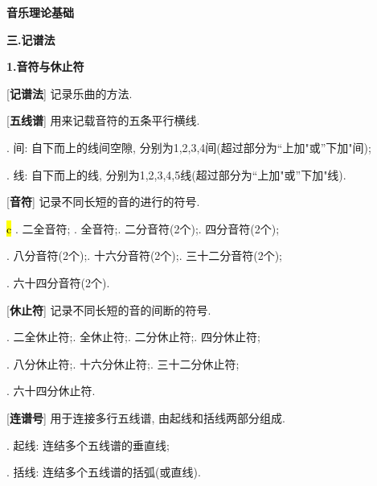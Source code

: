 

\begin{center} 
 \Large \textbf{音乐理论基础}\par
 \textbf{三.记谱法}
\end{center}

\large 
\begin{center}
 \textbf{1.音符与休止符}\\
\end{center}

[\textbf{记谱法}] 记录乐曲的方法.\par

[\textbf{五线谱}] 用来记载音符的五条平行横线.\par
\startextract \zendextract
{}. 间: 自下而上的线间空隙, 分别为1,2,3,4间(超过部分为``上加"或''下加"间);\par
{}. 线: 自下而上的线, 分别为1,2,3,4,5线(超过部分为``上加"或''下加"线).\par

[\textbf{音符}] 记录不同长短的音的进行的符号.\par
\startextract \Notes {}   \hl{c}           \en\zendextract
{}. 二全音符; . 全音符;. 二分音符(2个);. 四分音符(2个);\par
{}. 八分音符(2个);. 十六分音符(2个);. 三十二分音符(2个);\par
{}. 六十四分音符(2个).\par

[\textbf{休止符}] 记录不同长短的音的间断的符号.\par
\startextract \Notes \PAuse \pause \hp \qp \ds \qs \hs \qqs \en\zendextract
{}. 二全休止符;. 全休止符;. 二分休止符;. 四分休止符;\par
{}. 八分休止符;. 十六分休止符;. 三十二分休止符;\par
{}. 六十四分休止符.\par

[\textbf{连谱号}] 用于连接多行五线谱, 由起线和括线两部分组成.\par
{}
\startextract\zendextract
{}. 起线: 连结多个五线谱的垂直线;\par
{}. 括线: 连结多个五线谱的括弧(或直线).\par

\clearpage

